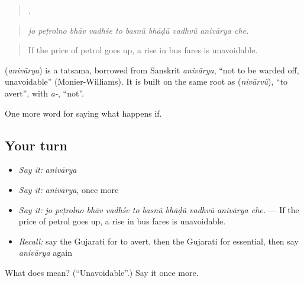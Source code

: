 \begin{quote}
         .
\end{quote}

\begin{quote}
\emph{jo peṭrolno bhāv vadhśe to basnũ bhāḍũ vadhvũ anivārya che.}
\end{quote}

\begin{quote}
If the price of petrol goes up, a rise in bus fares is unavoidable.
\end{quote}

\begin{cousinweb}
\textbf{} (\emph{anivārya}) is a tatsama, borrowed from Sanskrit \emph{anivārya}, \textquotedblleft{}not to be warded off, unavoidable\textquotedblright{} (Monier-Williams). It is built on the same root as \textbf{} (\emph{nivārvũ}), \textquotedblleft{}to avert\textquotedblright{}, with \emph{a-}, \textquotedblleft{}not\textquotedblright{}.
\end{cousinweb}

\begin{grammarlens}[title={What you've built}]
One more word for saying what happens if.
\end{grammarlens}

\subsection*{Your turn}
\begin{itemize}
\raggedright
  \item \emph{Say it:} \emph{anivārya}
  \item \emph{Say it:} \emph{anivārya}, once more
  \item \emph{Say it:} \emph{jo peṭrolno bhāv vadhśe to basnũ bhāḍũ vadhvũ anivārya che.} — If the price of petrol goes up, a rise in bus fares is unavoidable.
  \item \emph{Recall:} say the Gujarati for to avert, then the Gujarati for essential, then say \emph{anivārya} again
\end{itemize}

\begin{tcolorbox}[breakable,colback=teal!4,colframe=teal!35!black,title={Before you move on}]
What does  mean? (\textquotedblleft{}Unavoidable\textquotedblright{}.) Say it once more.
\end{tcolorbox}
